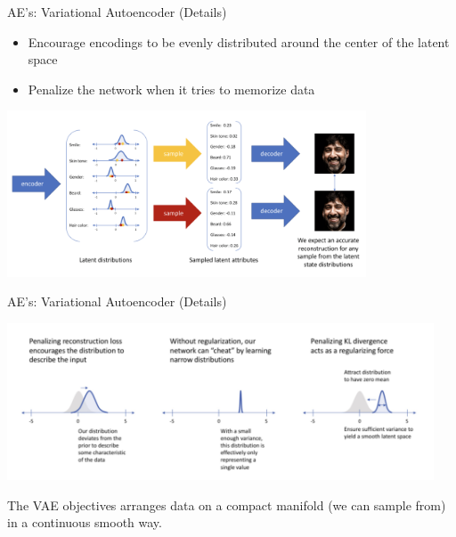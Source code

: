 \documentclass[serif, aspectratio=169]{beamer}
\begin{document}
\begin{frame}{AE's: Variational Autoencoder (Details)}
    \begin{itemize}
        \item Encourage encodings to be evenly distributed around the center of the latent space
        \item Penalize the network when it tries to memorize data
    \end{itemize}
    
    \begin{center}
        \includegraphics[width=0.8\textwidth]{pic/VAE details2.png}
        
            \vfill


    \end{center}
\end{frame}

\begin{frame}{AE's: Variational Autoencoder (Details)}
    \begin{center}
        \includegraphics[width=0.95\textwidth]{pic/VAE details3.png}
    \end{center}
    The VAE objectives arranges data on a compact manifold (we can sample from) in a continuous smooth way.

\end{frame}
\end{document}
